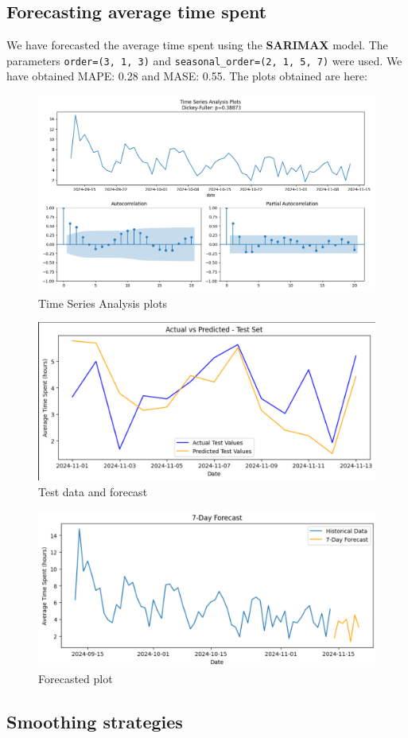 \documentclass{article}
\begin{document}
\subsection{Forecasting average time spent}

We have forecasted the average time spent using the \textbf{SARIMAX} model.
The parameters \texttt{order=(3, 1, 3)} and \texttt{seasonal\_order=(2, 1, 5, 7)} were used.
We have obtained MAPE: 0.28 and MASE: 0.55. The plots obtained are here:

\begin{figure}[H]
    \centering
    \includegraphics[width=0.5\linewidth]{1b_acf_pacf.png}
    \caption{Time Series Analysis plots}
\end{figure}

\begin{figure}[H]
    \centering
    \includegraphics[width=0.5\linewidth]{image.png}
    \caption{Test data and forecast}
\end{figure}

\begin{figure}[H]
    \centering
    \includegraphics[width=0.5\linewidth]{Screenshot 2024-10-29 004121.png}
    \caption{Forecasted plot}
\end{figure}

\subsection{Smoothing strategies}
\end{document}
